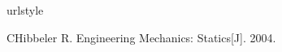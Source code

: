 
% 

% 
\begin{thebibliography}{148}
\providecommand{\natexlab}[1]{#1}
\providecommand{\url}[1]{\texttt{#1}}
\expandafter\ifx\csname urlstyle\endcsname\relax
\providecommand{\doi}[1]{doi: #1}\else
\providecommand{\doi}{doi: \begingroup \urlstyle{rm}\Url}\fi


CHibbeler R. Engineering Mechanics: Statics[J]. 2004.
\end{thebibliography}
